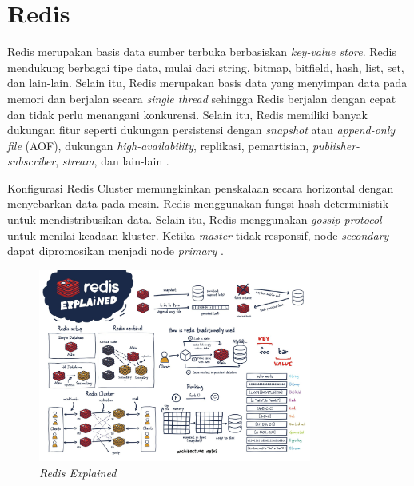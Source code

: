 \section{Redis}

Redis merupakan basis data sumber terbuka berbasiskan \textit{key-value store}. Redis mendukung berbagai tipe data, mulai dari string, bitmap, bitfield, hash, list, set, dan lain-lain. Selain itu, Redis merupakan basis data yang menyimpan data pada memori dan berjalan secara \textit{single thread} sehingga Redis berjalan dengan cepat dan tidak perlu menangani konkurensi. Selain itu, Redis memiliki banyak dukungan fitur seperti dukungan persistensi dengan \textit{snapshot} atau \textit{append-only file} (AOF), dukungan \textit{high-availability}, replikasi, pemartisian, \textit{publisher-subscriber}, \textit{stream}, dan lain-lain \parencite{redisExplained}.

Konfigurasi Redis Cluster memungkinkan penskalaan secara horizontal dengan menyebarkan data pada mesin. Redis menggunakan fungsi hash deterministik untuk mendistribusikan data. Selain itu, Redis menggunakan \textit{gossip protocol} untuk menilai keadaan kluster. Ketika \textit{master} tidak responsif, node \textit{secondary} dapat dipromosikan menjadi node \textit{primary} \parencite{redisExplained}.

\begin{figure}[htbp]
    \centering
    \includegraphics[width=0.8\textwidth]{resources/chapter-2/redis.jpg}
    \caption{\textit{Redis Explained \parencite{redisExplained}}}
    \label{fig:redis-explained}
\end{figure}
